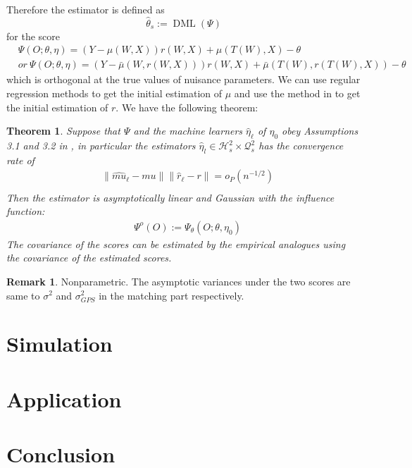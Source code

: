 \documentclass[11pt]{article}
\numberwithin{equation}{section}
\newtheorem{theorem}{Theorem}[section]
\theoremstyle{definition}
\newtheorem{remark}{Remark}[section]
\begin{document}
Therefore the estimator is defined as
\begin{equation}
\widehat{\theta}_{s}:=\operatorname{DML}\left(\Psi\right)
\end{equation}
for the score
\begin{align}
    &\Psi(O;\theta,\eta)=(Y-\mu(W,X))r(W,X)+\mu(T(W),X)-\theta\\
    &or\ \Psi(O;\theta,\eta)=(Y-\bar{\mu}(W,r(W,X)))r(W,X)+\bar{\mu}(T(W),r(T(W),X))-\theta 
\end{align}
which is orthogonal at the true values of nuisance parameters. We can use regular regression methods to get the initial estimation of $\mu$ and use the method in \cite{lin2023estimation} to get the initial estimation of $r$. We have the following theorem:
\begin{theorem}\label{thm:3}
Suppose that $\Psi$ and the machine
learners $\widehat{\eta}_{\ell}$ of $\eta_0$ obey Assumptions 3.1 and 3.2 in \cite{chernozhukov2018double}, in particular the estimators $\widehat{\eta}_{l} \in \mathcal{H}_s^2\times \mathcal{Q}_s^2$ has the convergence rate of
\begin{align}
    &\|\widehat{mu}_{\ell}-mu\|\|\widehat{r}_{\ell}-r\|=o_P(n^{-1/2})\\
\end{align}
Then the estimator is asymptotically linear and Gaussian with the influence function:
\begin{align}
&\Psi^{o}(O):=\Psi_{\theta}\left(O ; \theta, \eta_0\right)
\end{align}
The covariance of the scores can be estimated by the empirical analogues using the covariance of the estimated scores.
\end{theorem}
\begin{remark}
    Nonparametric. The asymptotic variances under the two scores are same to $\sigma^2$ and $\sigma_{GPS}^2$ in the matching part respectively.
\end{remark}

\section{Simulation}\label{sec:simu}
\section{Application}\label{sec:appli}
\section{Conclusion}\label{sec:concl}
\end{document}

